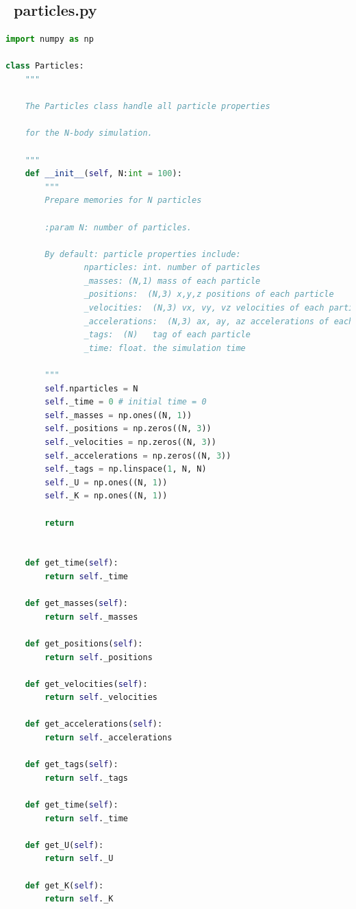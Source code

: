 \documentclass[12pt]{article}
\begin{document}
    \subsection{{\ttfamily\ particles.py}}
      \begin{lstlisting}[language={Python}]
import numpy as np

class Particles:
    """
    
    The Particles class handle all particle properties

    for the N-body simulation. 

    """
    def __init__(self, N:int = 100):
        """
        Prepare memories for N particles

        :param N: number of particles.

        By default: particle properties include:
                nparticles: int. number of particles
                _masses: (N,1) mass of each particle
                _positions:  (N,3) x,y,z positions of each particle
                _velocities:  (N,3) vx, vy, vz velocities of each particle
                _accelerations:  (N,3) ax, ay, az accelerations of each partciel
                _tags:  (N)   tag of each particle
                _time: float. the simulation time 

        """
        self.nparticles = N
        self._time = 0 # initial time = 0
        self._masses = np.ones((N, 1))
        self._positions = np.zeros((N, 3))
        self._velocities = np.zeros((N, 3))
        self._accelerations = np.zeros((N, 3))
        self._tags = np.linspace(1, N, N)
        self._U = np.ones((N, 1))
        self._K = np.ones((N, 1))
        
        return


    def get_time(self):
        return self._time
    
    def get_masses(self):
        return self._masses
    
    def get_positions(self):
        return self._positions
    
    def get_velocities(self):
        return self._velocities
    
    def get_accelerations(self):
        return self._accelerations
    
    def get_tags(self):
        return self._tags
    
    def get_time(self):
        return self._time
    
    def get_U(self):
        return self._U
    
    def get_K(self):
        return self._K



\end{lstlisting}
\end{document}

